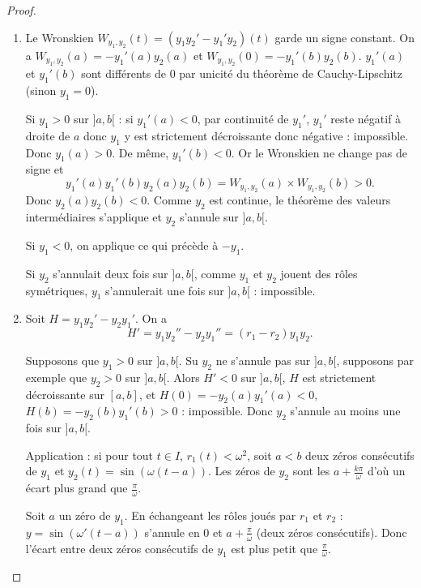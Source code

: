 \documentclass[12pt]{article}
\begin{document}
\begin{proof}
	\phantom{}
	\begin{enumerate}
		\item Le Wronskien $W_{y_1,y_2}(t)=(y_1 y_2'-y_1' y_2)(t)$ garde un signe constant. On a $W_{y_1,y_2}(a)=-y_1'(a)y_2(a)$ et $W_{y_1,y_2}(0)=-y_1'(b)y_2(b)$. $y_1'(a)$ et $y_1'(b)$ sont différents de 0 par unicité du théorème de Cauchy-Lipschitz (sinon $y_1=0$).
		
		Si $y_1>0$ sur $]a,b[$ : si $y_1'(a)<0$, par continuité de $y_1'$, $y_1'$ reste négatif à droite de $a$ donc $y_1$ y est strictement décroissante donc négative : impossible. Donc $y_1(a)>0$. De même, $y_1'(b)<0$. Or le Wronskien ne change pas de signe et 
		\begin{equation*}
			y_1'(a)y_1'(b)y_2(a) y_2(b)=W_{y_1,y_2}(a)\times W_{y_1,y_2}(b)>0.
		\end{equation*}
		Donc $y_2(a) y_2(b)<0$. Comme $y_2$ est continue, le théorème des valeurs intermédiaires s'applique et $y_2$ s'annule sur $]a,b[$. 

		Si $y_1<0$, on applique ce qui précède à $-y_1$.

		Si $y_2$ s'annulait deux fois sur $]a,b[$, comme $y_1$ et $y_2$ jouent des rôles symétriques, $y_1$ s'annulerait une fois sur $]a,b[$ : impossible.

		\item Soit $H=y_1 y_2'-y_2 y_1'$. On a 
		\begin{equation*}
			H'=y_1 y_2''-y_2 y_1''=(r_1-r_2)y_1 y_2.
		\end{equation*}

		Supposons que $y_1>0$ sur $]a,b[$. Su $y_2$ ne s'annule pas sur $]a,b[$, supposons par exemple que $y_2>0$ sur $]a,b[$. Alors $H'<0$ sur $]a,b[$, $H$ est strictement décroissante sur $[a,b]$, et $H(0)=-y_2(a) y_1'(a)<0$, $H(b)=-y_2(b) y_1'(b)>0$ : impossible. Donc $y_2$ s'annule au moins une fois sur $]a,b[$.

		Application : si pour tout $t\in I$, $r_1(t)<\omega^{2}$, soit $a<b$ deux zéros consécutifs de $y_1$ et $y_2(t)=\sin(\omega(t-a))$. Les zéros de $y_2$ sont les $a+\frac{k\pi}{\omega}$ d'où un écart plus grand que $\frac{\pi}{\omega}$.

		Soit $a$ un zéro de $y_1$. En échangeant les rôles joués par $r_1$ et $r_2$ : $y=\sin(\omega'(t-a))$ s'annule en $0$ et $a+\frac{\pi}{\omega}$ (deux zéros consécutifs). Donc l'écart entre deux zéros consécutifs de $y_1$ est plus petit que $\frac{\pi}{\omega}$.
	\end{enumerate}
\end{proof}
\end{document}
